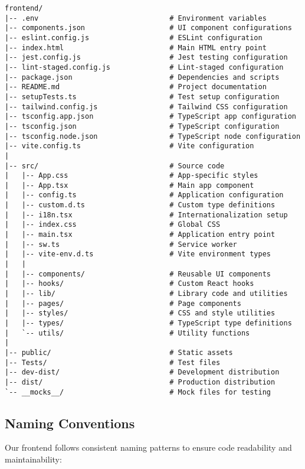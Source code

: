 \documentclass[12pt]{article}
\begin{document}
\begin{lstlisting}[frame=single, numbers=none, basicstyle=\ttfamily\footnotesize, columns=flexible]
frontend/
|-- .env                               # Environment variables
|-- components.json                    # UI component configurations
|-- eslint.config.js                   # ESLint configuration
|-- index.html                         # Main HTML entry point
|-- jest.config.js                     # Jest testing configuration
|-- lint-staged.config.js              # Lint-staged configuration
|-- package.json                       # Dependencies and scripts
|-- README.md                          # Project documentation
|-- setupTests.ts                      # Test setup configuration
|-- tailwind.config.js                 # Tailwind CSS configuration
|-- tsconfig.app.json                  # TypeScript app configuration
|-- tsconfig.json                      # TypeScript configuration
|-- tsconfig.node.json                 # TypeScript node configuration
|-- vite.config.ts                     # Vite configuration
|
|-- src/                               # Source code
|   |-- App.css                        # App-specific styles
|   |-- App.tsx                        # Main app component
|   |-- config.ts                      # Application configuration
|   |-- custom.d.ts                    # Custom type definitions
|   |-- i18n.tsx                       # Internationalization setup
|   |-- index.css                      # Global CSS
|   |-- main.tsx                       # Application entry point
|   |-- sw.ts                          # Service worker
|   |-- vite-env.d.ts                  # Vite environment types
|   |
|   |-- components/                    # Reusable UI components
|   |-- hooks/                         # Custom React hooks
|   |-- lib/                           # Library code and utilities
|   |-- pages/                         # Page components
|   |-- styles/                        # CSS and style utilities
|   |-- types/                         # TypeScript type definitions
|   `-- utils/                         # Utility functions
|
|-- public/                            # Static assets
|-- Tests/                             # Test files
|-- dev-dist/                          # Development distribution
|-- dist/                              # Production distribution
`-- __mocks__/                         # Mock files for testing
\end{lstlisting}

\subsection{Naming Conventions}
Our frontend follows consistent naming patterns to ensure code readability and maintainability:
\end{document}

